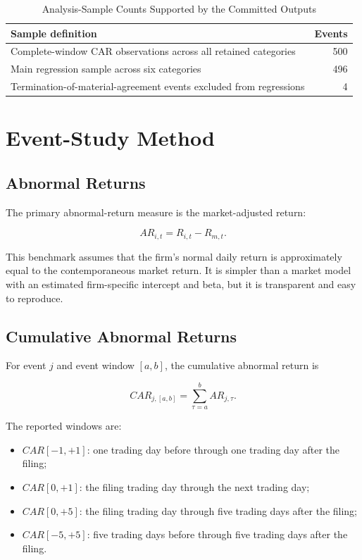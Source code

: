 \documentclass[12pt]{article}
\begin{document}
\begin{table}[H]
\centering
\caption{Analysis-Sample Counts Supported by the Committed Outputs}
\label{tab:analysis_sample}
\begin{tabular}{lr}
\toprule
Sample definition & Events \\
\midrule
Complete-window CAR observations across all retained categories & 500 \\
Main regression sample across six categories & 496 \\
Termination-of-material-agreement events excluded from regressions & 4 \\
\bottomrule
\end{tabular}
\end{table}

\section{Event-Study Method}

\subsection{Abnormal Returns}

The primary abnormal-return measure is the market-adjusted return:

\begin{equation}
AR_{i,t}=R_{i,t}-R_{m,t}.
\end{equation}

This benchmark assumes that the firm's normal daily return is approximately equal to the contemporaneous market return. It is simpler than a market model with an estimated firm-specific intercept and beta, but it is transparent and easy to reproduce.

\subsection{Cumulative Abnormal Returns}

For event $j$ and event window $[a,b]$, the cumulative abnormal return is

\begin{equation}
CAR_{j,[a,b]}=\sum_{\tau=a}^{b}AR_{j,\tau}.
\end{equation}

The reported windows are:

\begin{itemize}
    \item $CAR[-1,+1]$: one trading day before through one trading day after the filing;
    \item $CAR[0,+1]$: the filing trading day through the next trading day;
    \item $CAR[0,+5]$: the filing trading day through five trading days after the filing;
    \item $CAR[-5,+5]$: five trading days before through five trading days after the filing.
\end{itemize}
\end{document}
